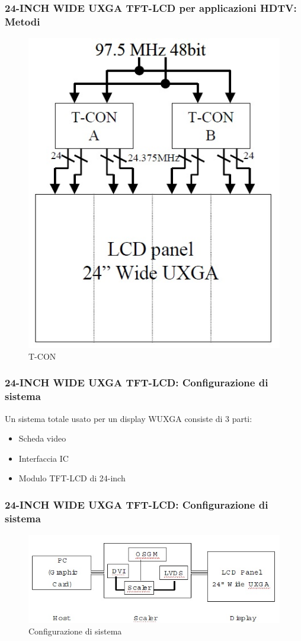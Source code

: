 \documentclass[12pt]{beamer}
\begin{document}
	\begin{frame}
		\frametitle{24-INCH WIDE UXGA TFT-LCD per applicazioni HDTV:  Metodi}
		\begin{figure}
			\centering
			\includegraphics[width=0.5\linewidth]{FISICA/T-CON}
			\caption{T-CON}
			\label{fig:t-con}
		\end{figure}
	\end{frame}
	\begin{frame}
		\frametitle{24-INCH WIDE UXGA TFT-LCD: Configurazione di sistema}
		Un sistema totale usato per un display WUXGA consiste di 3 parti:
		\begin{itemize}
			\item Scheda video
			\item Interfaccia IC
			\item Modulo TFT-LCD di 24-inch
		\end{itemize}
	\end{frame}
	\begin{frame}
		\frametitle{24-INCH WIDE UXGA TFT-LCD: Configurazione di sistema}
		\begin{figure}
			\centering
			\includegraphics[width=1\linewidth]{FISICA/sistema_di_conf}
			\caption{Configurazione di sistema}
			\label{fig:sistemadiconf}
		\end{figure}
	\end{frame}
\end{document}
